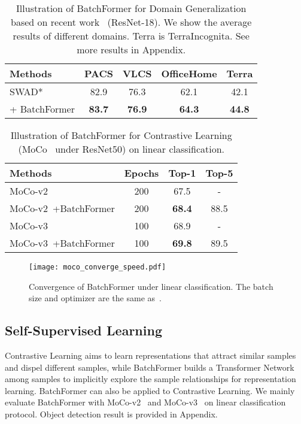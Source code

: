 \documentclass[10pt,twocolumn,letterpaper]{article}
\begin{document}
\begin{table}[tp]
\small
\caption{Illustration of BatchFormer for Domain Generalization based on recent work~\cite{cha2021swad} (ResNet-18). We show the average results of different domains. Terra is TerraIncognita. See more results in Appendix. }
\label{table:dg_swad}
\centering
\begin{tabular}{@{}lcccc@{}}
\hline
Methods  & PACS & VLCS & OfficeHome & Terra   \\
\hline
SWAD*~\cite{cha2021swad} & 82.9 & 76.3& 62.1 & 42.1 \\
 + BatchFormer & {\bf 83.7} & {\bf 76.9} & {\bf 64.3} & {\bf 44.8}\\
\hline
\end{tabular}
\end{table}






\begin{table}[tp]
\small
\caption{Illustration of BatchFormer for Contrastive Learning (MoCo~\cite{he2019moco, chen2020mocov2, chen2021mocov3} under ResNet50) on linear  classification.}
\label{table:moco}
\centering
\begin{tabular}{@{}lccc@{}}
\hline
Methods & Epochs & Top-1 & Top-5 \\
\hline
MoCo-v2~\cite{chen2020mocov2}    & 200 & 67.5 & -\\
MoCo-v2~\cite{chen2020mocov2}+BatchFormer & 200 & {\bf 68.4} & 88.5\\
\hline
MoCo-v3~\cite{chen2021mocov3} & 100 & 68.9 & - \\
MoCo-v3~\cite{chen2021mocov3}+BatchFormer & 100 & {\bf 69.8} & 89.5 \\
\hline
\end{tabular}
\end{table}

\begin{figure}
    \centering
    \texttt{[image: moco\_converge\_speed.pdf]}
    \caption{Convergence of BatchFormer under linear classification. The batch size and optimizer are the same as~\cite{chen2021mocov3}.}
    \label{fig:conveg_bt}
\end{figure}


\subsection{Self-Supervised Learning}
Contrastive Learning aims to learn representations that attract similar samples and dispel different samples, while BatchFormer builds a Transformer Network among samples to implicitly explore the sample relationships for representation learning. BatchFormer can also be applied to Contrastive Learning. We mainly evaluate BatchFormer with MoCo-v2~\cite{chen2020mocov2} and MoCo-v3~\cite{chen2021mocov3} on linear classification protocol. Object detection result is provided in Appendix.
\end{document}
